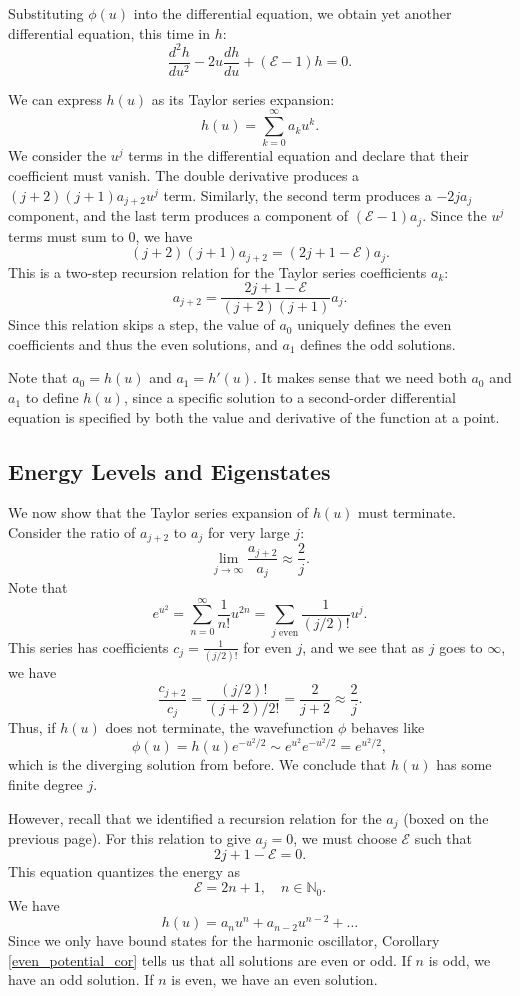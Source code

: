 Substituting $\phi(u)$ into the differential equation, we obtain yet another differential equation, this time in $h$: $$\frac{d^2h}{du^2}-2u\frac{dh}{du}+(\mathcal{E}-1)h=0.$$

We can express $h(u)$ as its Taylor series expansion: $$h(u)=\sum_{k=0}^\infty a_ku^k.$$We consider the $u^j$ terms in the differential equation and declare that their coefficient must vanish. The double derivative produces a $(j+2)(j+1)a_{j+2}u^j$ term. Similarly, the second term produces a $-2ja_j$ component, and the last term produces a component of $(\mathcal{E}-1)a_j$. Since the $u^j$ terms must sum to $0$, we have $$(j+2)(j+1)a_{j+2}=(2j+1-\mathcal{E})a_j.$$This is a two-step recursion relation for the Taylor series coefficients $a_k$: $$\boxed{a_{j+2}=\frac{2j+1-\mathcal{E}}{(j+2)(j+1)}a_j}.$$Since this relation skips a step, the value of $a_0$ uniquely defines the even coefficients and thus the even solutions, and $a_1$ defines the odd solutions.
\newpage
\begin{framedrmk*}
    Note that $a_0=h(u)$ and $a_1=h'(u)$. It makes sense that we need both $a_0$ and $a_1$ to define $h(u)$, since a specific solution to a second-order differential equation is specified by both the value and derivative of the function at a point.
\end{framedrmk*}

\subsection{Energy Levels and Eigenstates}\label{energy_levels_eigenstates_harmonic_oscillator}

We now show that the Taylor series expansion of $h(u)$ must terminate. Consider the ratio of $a_{j+2}$ to $a_j$ for very large $j$: $$\lim_{j\to\infty}\frac{a_{j+2}}{a_j}\approx\frac{2}{j}.$$Note that $$e^{u^2}=\sum_{n=0}^\infty\frac{1}{n!}u^{2n}=\sum_{j\text{ even}}\frac{1}{(j/2)!}u^j.$$This series has coefficients $c_j=\frac{1}{(j/2)!}$ for even $j$, and we see that as $j$ goes to $\infty$, we have $$\frac{c_{j+2}}{c_j}=\frac{(j/2)!}{(j+2)/2!}=\frac{2}{j+2}\approx\frac{2}{j}.$$ Thus, if $h(u)$ does not terminate, the wavefunction $\phi$ behaves like $$\phi(u)=h(u)e^{-u^2/2}\sim e^{u^2}e^{-u^2/2}= e^{u^2/2},$$which is the diverging solution from before. We conclude that $h(u)$ has some finite degree $j$.

However, recall that we identified a recursion relation for the $a_j$ (boxed on the previous page). For this relation to give $a_j=0$, we must choose $\mathcal{E}$ such that $$2j+1-\mathcal{E}=0.$$This equation quantizes the energy as $$\mathcal{E}=2n+1,\quad n\in\mathbb{N}_0.$$We have $$h(u)=a_nu^n+a_{n-2}u^{n-2}+\ldots$$Since we only have bound states for the harmonic oscillator, Corollary \ref{even_potential_cor} tells us that all solutions are even or odd. If $n$ is odd, we have an odd solution. If $n$ is even, we have an even solution. 

